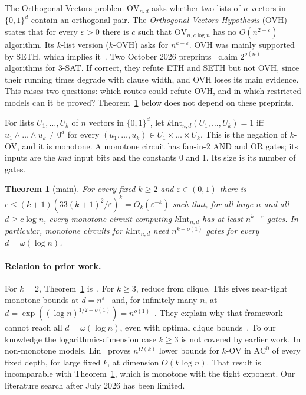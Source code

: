 \documentclass[11pt,a4paper]{article}
\theoremstyle{plain}
\newtheorem{theorem}{Theorem}
\theoremstyle{definition}
\theoremstyle{remark}
\newcommand{\OV}{\mathrm{OV}}
\newcommand{\kInt}{k\mathrm{Int}}
\begin{document}
The Orthogonal Vectors problem $\OV_{n,d}$ asks whether two lists of $n$ vectors in $\{0,1\}^d$ contain an orthogonal
pair. The \emph{Orthogonal Vectors Hypothesis} (OVH) states that for every $\varepsilon>0$ there is $c$ such that
$\OV_{n,c\log n}$ has no $O(n^{2-\varepsilon})$ algorithm. Its $k$-list version ($k$-OVH) asks for $n^{k-\varepsilon}$.
OVH was mainly supported by SETH, which implies it~\cite{Wil05}. Two October 2026 preprints~\cite{OpenAI26,Anthropic26}
claim $2^{o(n)}$ algorithms for 3-SAT. If correct, they refute ETH and SETH but not OVH, since their running times
degrade with clause width, and OVH loses its main evidence. This raises two questions: which routes could refute OVH,
and in which restricted models can it be proved? Theorem~\ref{thm:main} below does not depend on these preprints.

For lists $U_1,\dots,U_k$ of $n$ vectors in $\{0,1\}^d$, let $\kInt_{n,d}(U_1,\dots,U_k)=1$ iff
$u_1\wedge\dots\wedge u_k\ne0^d$ for every $(u_1,\dots,u_k)\in U_1\times\dots\times U_k$. This is the negation of
$k$-OV, and it is monotone. A monotone circuit has fan-in-2 AND and OR gates; its inputs are the $knd$ input bits
and the constants 0 and 1. Its size is its number of gates.

\begin{theorem}[main]\label{thm:main}
For every fixed $k\ge2$ and $\varepsilon\in(0,1)$ there is $c\le(k+1)(33(k+1)^2/\varepsilon)^k=O_k(\varepsilon^{-k})$
such that, for all large $n$ and all $d\ge c\log n$, every monotone circuit computing $\kInt_{n,d}$ has at least
$n^{k-\varepsilon}$ gates. In particular, monotone circuits for $\kInt_{n,d}$ need $n^{k-o(1)}$ gates for every
$d=\omega(\log n)$.
\end{theorem}

\paragraph{Relation to prior work.} For $k=2$, Theorem~\ref{thm:main} is~\cite[Thm~5]{CLSS26}. For $k\ge3$,
\cite{CLSS26} reduce from clique. This gives near-tight monotone bounds at $d=n^{\varepsilon}$~\cite[Thm~4]{CLSS26}
and, for infinitely many $n$, at $d=\exp((\log n)^{1/2+o(1)})=n^{o(1)}$~\cite[Cor~13]{CLSS26}. They explain why that
framework cannot reach all $d=\omega(\log n)$, even with optimal clique bounds~\cite[Remark~16]{CLSS26}. To our
knowledge the logarithmic-dimension case $k\ge3$ is not covered by earlier work. In non-monotone models,
Lin~\cite{Lin26} proves $n^{\Omega(k)}$ lower bounds for $k$-OV in $\mathrm{AC}^0$ of every fixed depth, for large
fixed $k$, at dimension $O(k\log n)$. That result is incomparable with Theorem~\ref{thm:main}, which is monotone with
the tight exponent. Our literature search after July 2026 has been limited.
\end{document}
